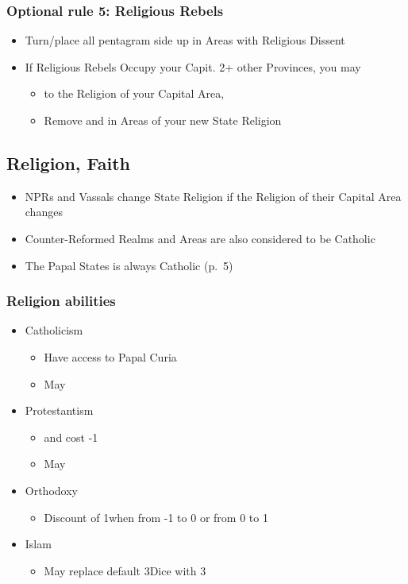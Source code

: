 \documentclass[10pt]{article}
\begin{document}
\subsubsection*{Optional rule 5: Religious Rebels}
\begin{itemize}
	\item Turn/place all \rebeltowns pentagram side up in Areas with Religious Dissent
	\item If Religious Rebels Occupy your Capit.  2+ other Provinces, you may
	\begin{itemize}
		\item {} to the Religion of your Capital Area, 
		\item Remove \rebels and \rebeltowns in Areas of your new State Religion
	\end{itemize}
\end{itemize}

\subsection*{Religion, Faith }
\begin{itemize}
	\item NPRs and Vassals change State Religion if the Religion of their Capital Area changes
	\item Counter-Reformed Realms and Areas are also considered to be Catholic
	\item The \guilsinglright Papal States is always Catholic (p.~5)
\end{itemize}

\subsubsection*{Religion abilities}
\begin{itemize}
	\item Catholicism
	\begin{itemize}
		\item Have access to Papal Curia
		\item May 
	\end{itemize}
	\item Protestantism
	\begin{itemize}
		\item {} and  cost -1\adminpower
		\item May 
	\end{itemize}
	\item{Orthodoxy}
	\begin{itemize}
		\item Discount of 1\adminpower when  from -1 to 0 or from 0 to 1
	\end{itemize}
	\item{Islam}
	\begin{itemize}
		\item May replace default 3\infantry Dice with 3\cavalry
	\end{itemize}
\end{itemize}
\end{document}
